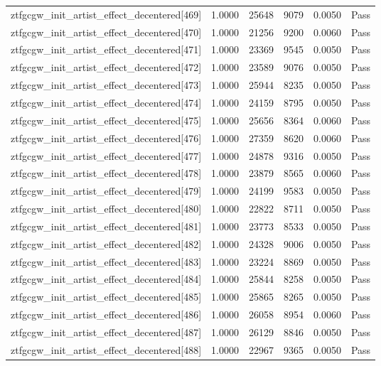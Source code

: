 \begin{table}[htbp]
\begin{tabular}{llrrll}
ztfgcgw\_init\_artist\_effect\_decentered[469] & 1.0000 & 25648 & 9079 & 0.0050 & Pass \\
ztfgcgw\_init\_artist\_effect\_decentered[470] & 1.0000 & 21256 & 9200 & 0.0060 & Pass \\
ztfgcgw\_init\_artist\_effect\_decentered[471] & 1.0000 & 23369 & 9545 & 0.0050 & Pass \\
ztfgcgw\_init\_artist\_effect\_decentered[472] & 1.0000 & 23589 & 9076 & 0.0050 & Pass \\
ztfgcgw\_init\_artist\_effect\_decentered[473] & 1.0000 & 25944 & 8235 & 0.0050 & Pass \\
ztfgcgw\_init\_artist\_effect\_decentered[474] & 1.0000 & 24159 & 8795 & 0.0050 & Pass \\
ztfgcgw\_init\_artist\_effect\_decentered[475] & 1.0000 & 25656 & 8364 & 0.0060 & Pass \\
ztfgcgw\_init\_artist\_effect\_decentered[476] & 1.0000 & 27359 & 8620 & 0.0060 & Pass \\
ztfgcgw\_init\_artist\_effect\_decentered[477] & 1.0000 & 24878 & 9316 & 0.0050 & Pass \\
ztfgcgw\_init\_artist\_effect\_decentered[478] & 1.0000 & 23879 & 8565 & 0.0060 & Pass \\
ztfgcgw\_init\_artist\_effect\_decentered[479] & 1.0000 & 24199 & 9583 & 0.0050 & Pass \\
ztfgcgw\_init\_artist\_effect\_decentered[480] & 1.0000 & 22822 & 8711 & 0.0050 & Pass \\
ztfgcgw\_init\_artist\_effect\_decentered[481] & 1.0000 & 23773 & 8533 & 0.0050 & Pass \\
ztfgcgw\_init\_artist\_effect\_decentered[482] & 1.0000 & 24328 & 9006 & 0.0050 & Pass \\
ztfgcgw\_init\_artist\_effect\_decentered[483] & 1.0000 & 23224 & 8869 & 0.0050 & Pass \\
ztfgcgw\_init\_artist\_effect\_decentered[484] & 1.0000 & 25844 & 8258 & 0.0050 & Pass \\
ztfgcgw\_init\_artist\_effect\_decentered[485] & 1.0000 & 25865 & 8265 & 0.0050 & Pass \\
ztfgcgw\_init\_artist\_effect\_decentered[486] & 1.0000 & 26058 & 8954 & 0.0060 & Pass \\
ztfgcgw\_init\_artist\_effect\_decentered[487] & 1.0000 & 26129 & 8846 & 0.0050 & Pass \\
ztfgcgw\_init\_artist\_effect\_decentered[488] & 1.0000 & 22967 & 9365 & 0.0050 & Pass \\

\end{tabular}
\end{table}
